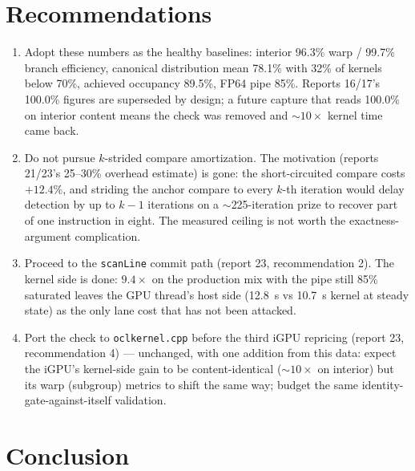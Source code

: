 \documentclass[
	english,
	letterpaper, oneside
]{article}
\begin{document}
\section{Recommendations}
\label{sec:recommendations}

\begin{enumerate}
  \item Adopt these numbers as the healthy baselines: interior
        96.3\% warp / 99.7\% branch efficiency, canonical distribution
        mean 78.1\% with 32\% of kernels below 70\%, achieved occupancy
        89.5\%, FP64 pipe 85\%. Reports 16/17's 100.0\% figures are
        superseded by design; a future capture that reads 100.0\% on
        interior content means the check was removed and $\sim$$10\times$
        kernel time came back.
  \item Do not pursue $k$-strided compare amortization. The
        motivation (reports 21/23's 25--30\% overhead estimate) is gone:
        the short-circuited compare costs $+12.4\%$, and striding the
        anchor compare to every $k$-th iteration would delay detection by
        up to $k-1$ iterations on a $\sim$225-iteration prize to recover
        part of one instruction in eight. The measured ceiling is not
        worth the exactness-argument complication.
  \item Proceed to the \texttt{scanLine} commit path (report 23,
        recommendation 2). The kernel side is done: $9.4\times$ on the
        production mix with the pipe still 85\% saturated leaves the GPU
        thread's host side (12.8~s vs 10.7~s kernel at steady state) as
        the only lane cost that has not been attacked.
  \item Port the check to \texttt{oclkernel.cpp} before the third
        iGPU repricing (report 23, recommendation 4) --- unchanged, with
        one addition from this data: expect the iGPU's kernel-side gain to
        be content-identical ($\sim$$10\times$ on interior) but its warp
        (subgroup) metrics to shift the same way; budget the same
        identity-gate-against-itself validation.
\end{enumerate}

\section{Conclusion}
\end{document}
